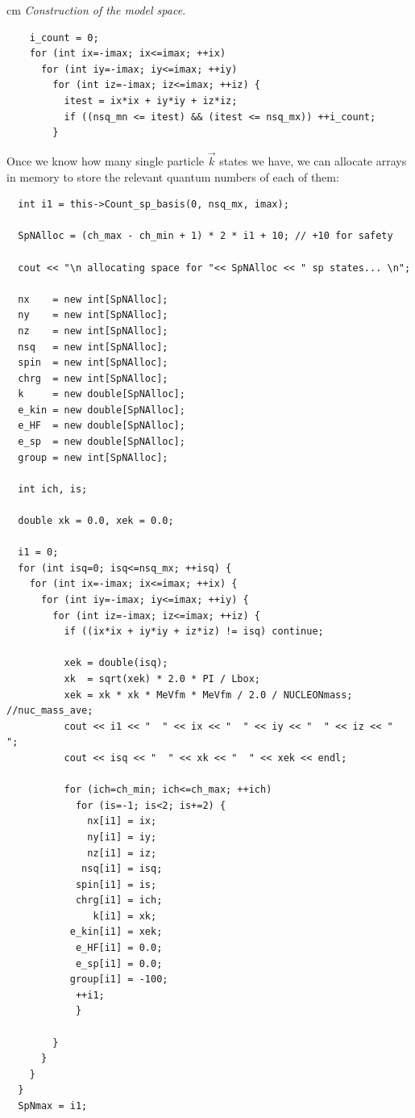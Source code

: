  cm
{\em Construction of the model space.}
\lstset{language=c++}
\begin{lstlisting}
    i_count = 0;
    for (int ix=-imax; ix<=imax; ++ix)
      for (int iy=-imax; iy<=imax; ++iy)
        for (int iz=-imax; iz<=imax; ++iz) {
          itest = ix*ix + iy*iy + iz*iz;
          if ((nsq_mn <= itest) && (itest <= nsq_mx)) ++i_count;
        }
\end{lstlisting}
Once we know how many single particle $\vec k$ states we have, we can allocate 
arrays in memory to store the relevant quantum numbers of each of them:
\begin{lstlisting}
  int i1 = this->Count_sp_basis(0, nsq_mx, imax);
 
  SpNAlloc = (ch_max - ch_min + 1) * 2 * i1 + 10; // +10 for safety
  
  cout << "\n allocating space for "<< SpNAlloc << " sp states... \n";
  
  nx    = new int[SpNAlloc];
  ny    = new int[SpNAlloc];
  nz    = new int[SpNAlloc];
  nsq   = new int[SpNAlloc];
  spin  = new int[SpNAlloc];
  chrg  = new int[SpNAlloc];
  k     = new double[SpNAlloc];
  e_kin = new double[SpNAlloc];
  e_HF  = new double[SpNAlloc];
  e_sp  = new double[SpNAlloc];
  group = new int[SpNAlloc];
  
  int ich, is;

  double xk = 0.0, xek = 0.0;
  
  i1 = 0;
  for (int isq=0; isq<=nsq_mx; ++isq) {
    for (int ix=-imax; ix<=imax; ++ix) {
      for (int iy=-imax; iy<=imax; ++iy) {
        for (int iz=-imax; iz<=imax; ++iz) {
          if ((ix*ix + iy*iy + iz*iz) != isq) continue;

          xek = double(isq);
          xk  = sqrt(xek) * 2.0 * PI / Lbox;
          xek = xk * xk * MeVfm * MeVfm / 2.0 / NUCLEONmass;  //nuc_mass_ave;
          cout << i1 << "  " << ix << "  " << iy << "  " << iz << "  ";
          cout << isq << "  " << xk << "  " << xek << endl;

          for (ich=ch_min; ich<=ch_max; ++ich)
            for (is=-1; is<2; is+=2) {
              nx[i1] = ix;
              ny[i1] = iy;
              nz[i1] = iz;
             nsq[i1] = isq;
            spin[i1] = is;
            chrg[i1] = ich;
               k[i1] = xk;
           e_kin[i1] = xek;
            e_HF[i1] = 0.0;
            e_sp[i1] = 0.0;
           group[i1] = -100;
            ++i1;
            }
        
        }
      }
    }
  }
  SpNmax = i1;
\end{lstlisting}

